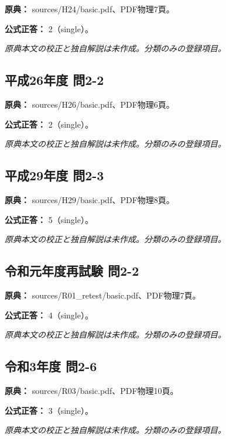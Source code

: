 \noindent\textbf{原典：} sources/H24/basic.pdf、PDF物理7頁。

\textbf{公式正答：} 2（single）。

\par\textit{原典本文の校正と独自解説は未作成。分類のみの登録項目。}

\subsection{平成26年度 問2-2}
\label{q:h26-reg-basic-2-2}

\noindent\textbf{原典：} sources/H26/basic.pdf、PDF物理6頁。

\textbf{公式正答：} 2（single）。

\par\textit{原典本文の校正と独自解説は未作成。分類のみの登録項目。}

\subsection{平成29年度 問2-3}
\label{q:h29-reg-basic-2-3}

\noindent\textbf{原典：} sources/H29/basic.pdf、PDF物理8頁。

\textbf{公式正答：} 5（single）。

\par\textit{原典本文の校正と独自解説は未作成。分類のみの登録項目。}

\subsection{令和元年度再試験 問2-2}
\label{q:r01-ret-basic-2-2}

\noindent\textbf{原典：} sources/R01\_retest/basic.pdf、PDF物理7頁。

\textbf{公式正答：} 4（single）。

\par\textit{原典本文の校正と独自解説は未作成。分類のみの登録項目。}

\subsection{令和3年度 問2-6}
\label{q:r03-reg-basic-2-6}

\noindent\textbf{原典：} sources/R03/basic.pdf、PDF物理10頁。

\textbf{公式正答：} 3（single）。

\par\textit{原典本文の校正と独自解説は未作成。分類のみの登録項目。}

